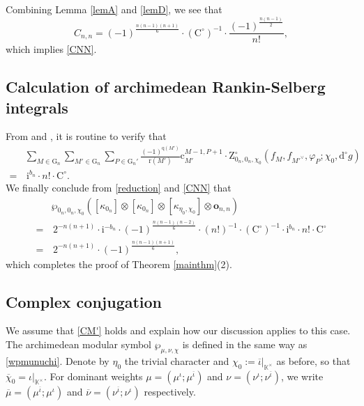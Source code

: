 \documentclass[12pt, a4paper]{amsart}
\newcommand{\RC}{{\mathrm {C}}}
\newcommand{\RG}{{\mathrm {G}}}
\newcommand{\RZ}{{\mathrm {Z}}}
\newcommand{\K}{\mathbb{K}}
\theoremstyle{Theorem}
\theoremstyle{Theorem}
\theoremstyle{Theorem}
\theoremstyle{Theorem}
\theoremstyle{Plain}
\theoremstyle{Definition}
\begin{document}
	Combining Lemma \ref{lemA} and \ref{lemD}, we see that
	\[
	C_{n,n}=(-1)^{\frac{n(n-1)(n+1)}{6}}\cdot(\RC^{\circ})^{-1}\cdot\frac{(-1)^{\frac{n(n-1)}{2}}}{n!},
	\]
	which implies \eqref{CNN}.
	
	
	
	
	
	
	
	\subsection{Calculation of archimedean Rankin-Selberg integrals}
	\label{sec:4.4}
	
	From \cite[Corollary 2.16]{IM} and \cite[Lemma 2.14]{HMN}, it is routine to verify that
	\[
	\begin{aligned}
		&\sum_{M\in\RG_n}\sum_{M'\in\RG_n}\sum_{P\in\RG_n'}\frac{(-1)^{\mathrm{q}(M')}}{\mathrm{r}(M')}\mathrm{c}_{M'}^{M-1,P+1}\cdot\RZ^{\circ}_{0_n,0_n,\chi_0}\left(f_M,f_{M'^{\vee}},\varphi_P;\chi_0,\mathrm{d}^{\circ}g\right)\\
		=& \,\mathrm{i}^{b_n}\cdot n!\cdot\mathrm{C}^{\circ}.
	\end{aligned}
	\]
	We finally conclude from \eqref{reduction} and \eqref{CNN} that
	\[
	\begin{aligned}
		&\wp_{0_n,0_n,\chi_0}\left([\kappa_{0_n}]\otimes[\kappa_{0_n}]\otimes[\kappa_{\eta_0,\chi_0}]\otimes\mathbf{o}_{n,n}\right)\\
		=&\,2^{-n(n+1)}\cdot\mathrm{i}^{-b_n}\cdot(-1)^{\frac{n(n-1)(n-2)}{6}}\cdot(n!)^{-1}\cdot(\mathrm{C}^{\circ})^{-1}\cdot\mathrm{i}^{b_n}\cdot n! \cdot \mathrm{C}^{\circ}\\
		=&\,2^{-n(n+1)}\cdot(-1)^{\frac{n(n-1)(n+1)}{6}},
	\end{aligned}
	\]
	which completes the proof of Theorem \ref{mainthm}(2).
	
	\subsection{Complex conjugation}\label{sec:complexconjugation}
	
	We assume that \eqref{CM'} holds and explain how our discussion applies to this case. The archimedean modular symbol $\wp_{\mu,\nu,\chi}$ is defined in the same way as \eqref{wpmunuchi}. Denote by $\eta_0$ the trivial character and $\chi_0:=\overline{\iota}|_{\K^{\times}}$ as before, so that $\overline{\chi}_0=\iota|_{\K^{\times}}$. For dominant weights $\mu=(\mu^{\iota};\mu^{\overline{\iota}})$ and $\nu=(\nu^{\iota};\nu^{\overline{\iota}})$, we write $\overline{\mu}=(\mu^{\overline{\iota}};\mu^{\iota})$ and $\overline{\nu}=(\nu^{\overline{\iota}};\nu^{\iota})$ respectively.
	
\end{document}

